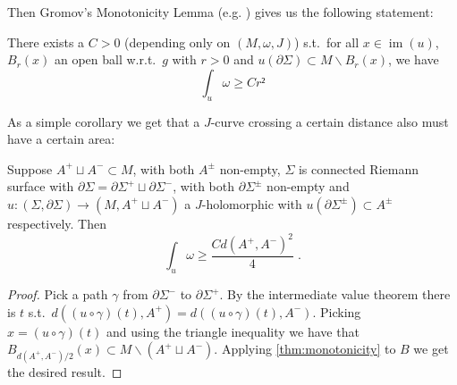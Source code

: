 \documentclass[12pt,a4paper,draft]{scrartcl}
\DeclareMathOperator{\im}{im}
\begin{document}
Then Gromov's Monotonicity Lemma (e.g. \cite[Proposition 4.3.1 (ii)]{sikorav1994}) gives us the following statement:

\begin{lemma}[Monotonicity]
  \label{thm:monotonicity}
  There exists a $C>0$ (depending only on $(M,ω,J)$) s.t.\ for all $x ∈ \im(u)$, $B_r(x)$ an open ball w.r.t.\ $g$ with $r > 0$ and $u(∂Σ) ⊂ M ∖ B_r(x)$, we have
  \[∫_u ω ≥ C r²\]
\end{lemma}

As a simple corollary we get that a $J$-curve crossing a certain distance also must have a certain area:

\begin{corollary}
  \label{thm:small_buffer}
  Suppose $A^+ ⊔ A^- ⊂ M$, with both $A^±$ non-empty, $Σ$ is connected Riemann surface with $∂Σ = ∂Σ^+ ⊔ ∂Σ^-$, with both $∂Σ^±$ non-empty and $u\colon (Σ,∂Σ) → (M,A^+ ⊔ A^-)$ a $J$-holomorphic with $u(∂Σ^±) ⊂ A^±$ respectively.
  Then
  \[∫_u ω ≥ \frac{C d(A^+,A^-)^2}{4} \; .\]
\end{corollary}

\begin{proof}
  Pick a path $γ$ from $∂Σ^-$ to $∂Σ^+$. By the intermediate value theorem there is $t$ s.t.\ $d((u ∘ γ) (t),A^+) = d((u ∘ γ)(t), A^-)$. Picking $x = (u ∘ γ)(t)$ and using the triangle inequality we have that $B_{d(A^+,A^-)/2}(x) ⊂ M ∖ ( A^+ ⊔ A^-) $. Applying \cref{thm:monotonicity} to $B$ we get the desired result.
\end{proof}
\end{document}
